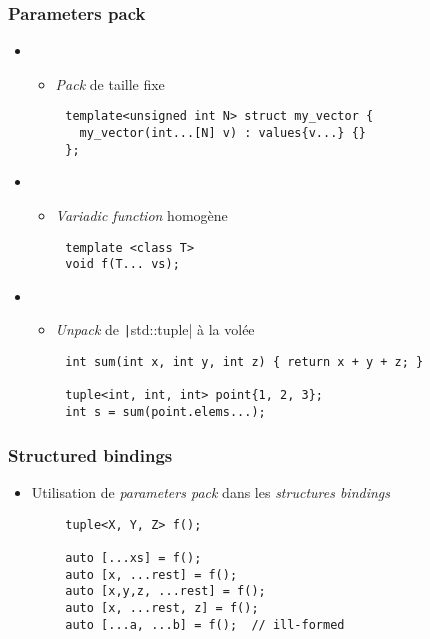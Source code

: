 \documentclass[C++.tex]{subfiles}
\begin{document}
\begin{frame}[fragile]
	\frametitle{Parameters pack}
	\begin{itemize}
		\item []
		\begin{itemize}
			\item \textit{Pack} de taille fixe
		\end{itemize}
	\end{itemize}

	\begin{verbatim}
		template<unsigned int N> struct my_vector {
		  my_vector(int...[N] v) : values{v...} {}
		};
	\end{verbatim}

	\begin{itemize}
		\item []
		\begin{itemize}
			\item \textit{Variadic function} homogène
		\end{itemize}
	\end{itemize}

	\begin{verbatim}
		template <class T>
		void f(T... vs);
	\end{verbatim}


	\begin{itemize}
		\item []
		\begin{itemize}
			\item \textit{Unpack} de \texttt|std::tuple| à la volée
		\end{itemize}
	\end{itemize}

	\begin{verbatim}
		int sum(int x, int y, int z) { return x + y + z; }

		tuple<int, int, int> point{1, 2, 3};
		int s = sum(point.elems...);
	\end{verbatim}
\end{frame}

\begin{frame}[fragile]
	\frametitle{Structured bindings}
	\begin{itemize}
		\item Utilisation de \textit{parameters pack} dans les \textit{structures bindings}
	\end{itemize}

	\begin{verbatim}
		tuple<X, Y, Z> f();

		auto [...xs] = f();
		auto [x, ...rest] = f();
		auto [x,y,z, ...rest] = f();
		auto [x, ...rest, z] = f();
		auto [...a, ...b] = f();  // ill-formed
	\end{verbatim}

\end{frame}
\end{document}
